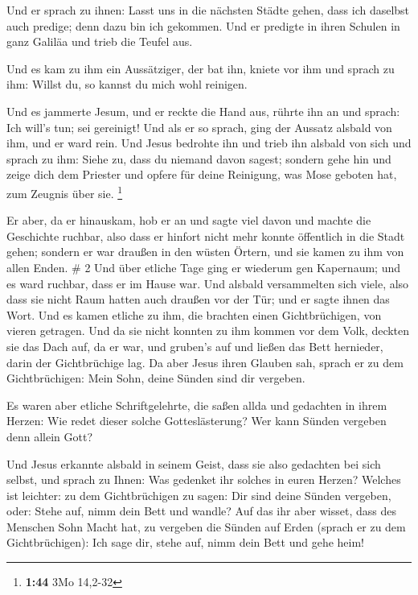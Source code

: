  Und er sprach zu ihnen: Lasst uns in die nächsten Städte
gehen, dass ich daselbst auch predige; denn dazu bin ich gekommen.
 Und er predigte in ihren Schulen in ganz Galiläa und trieb
die Teufel aus.

 Und es kam zu ihm ein Aussätziger, der bat ihn, kniete vor
ihm und sprach zu ihm: Willst du, so kannst du mich wohl reinigen.

 Und es jammerte Jesum, und er reckte die Hand aus, rührte
ihn an und sprach: Ich will's tun; sei gereinigt!  Und als
er so sprach, ging der Aussatz alsbald von ihm, und er ward rein.
 Und Jesus bedrohte ihn und trieb ihn alsbald von sich
 und sprach zu ihm: Siehe zu, dass du niemand davon sagest;
sondern gehe hin und zeige dich dem Priester und opfere für deine
Reinigung, was Mose geboten hat, zum Zeugnis über sie. \footnote{\textbf{1:44}
  3Mo 14,2-32}

 Er aber, da er hinauskam, hob er an und sagte viel davon
und machte die Geschichte ruchbar, also dass er hinfort nicht mehr
konnte öffentlich in die Stadt gehen; sondern er war draußen in den
wüsten Örtern, und sie kamen zu ihm von allen Enden. \# 2 
Und über etliche Tage ging er wiederum gen Kapernaum; und es ward
ruchbar, dass er im Hause war.  Und alsbald versammelten
sich viele, also dass sie nicht Raum hatten auch draußen vor der Tür;
und er sagte ihnen das Wort.  Und es kamen etliche zu ihm,
die brachten einen Gichtbrüchigen, von vieren getragen.  Und
da sie nicht konnten zu ihm kommen vor dem Volk, deckten sie das Dach
auf, da er war, und gruben's auf und ließen das Bett hernieder, darin
der Gichtbrüchige lag.  Da aber Jesus ihren Glauben sah,
sprach er zu dem Gichtbrüchigen: Mein Sohn, deine Sünden sind dir
vergeben.

 Es waren aber etliche Schriftgelehrte, die saßen allda und
gedachten in ihrem Herzen:  Wie redet dieser solche
Gotteslästerung? Wer kann Sünden vergeben denn allein Gott?

 Und Jesus erkannte alsbald in seinem Geist, dass sie also
gedachten bei sich selbst, und sprach zu Ihnen: Was gedenket ihr solches
in euren Herzen?  Welches ist leichter: zu dem
Gichtbrüchigen zu sagen: Dir sind deine Sünden vergeben, oder: Stehe
auf, nimm dein Bett und wandle?  Auf das ihr aber wisset,
dass des Menschen Sohn Macht hat, zu vergeben die Sünden auf Erden
(sprach er zu dem Gichtbrüchigen):  Ich sage dir, stehe
auf, nimm dein Bett und gehe heim!

